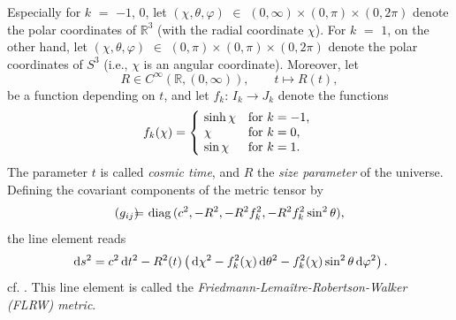 Especially for $k$ $=$ $-1$, $0$, let
$(\chi,\theta,\varphi)$ $\in$ $(0, \infty) \times (0,\pi) \times (0, 2\pi)$
denote the polar coordinates of $\mathbb{R}^3$ (with the radial coordinate $\chi$). For $k$ $=$ $1$, on the other hand, let $(\chi, \theta, \varphi)$ $\in$ $(0, \pi) \times (0,\pi) \times (0, 2\pi)$ denote the polar coordinates of $S^3$ (i.e., $\chi$ is an angular coordinate). Moreover, let
\begin{equation}
	R \in C^\infty(\mathbb{R}, (0, \infty)), \qquad t \mapsto R(t),
	\label{eq:FLRW-R} %
\end{equation}
be a function depending on $t$, and let $f_k$: $I_k \to J_k$ denote the functions
\begin{equation}
	f_k(\chi) = \left\{\begin{array}{@{\ }ll}
		\sinh \chi & \mbox{for $k=-1$,} \\
		\chi       & \mbox{for $k=0$,} \\
		\sin \chi  & \mbox{for $k=1$.}
	\end{array}\right.
	\label{(3.23)}
\end{equation}
The parameter $t$ is called \emph{cosmic time},
and $R$ the \emph{size parameter}
of the universe. 
Defining the covariant %
components of the metric tensor by
\begin{eqnarray*}
	(g_{ij}) & \hspace*{-1.5ex} = \hspace{-1.5ex} & 
	\mathrm{diag}\,(c^2, -R^2, -R^2 f_k^2, - R^2 f_k^2 \sin^2\theta)
	,
\end{eqnarray*}
the line element reads
\begin{equation}
	\D s^2 = 
	c^2 \D t^2 - R^2(t) \left( \D\chi^2 - f_k^2(\chi) \D \theta^2 - f_k^2(\chi) \sin^2 \theta \D\varphi^2 \right)
	.
	\label{eq:FLRW-line-element-in-polar-coordinates} %
\end{equation}
cf. \cite[(112,2)]{Landau-Lifschitz-1997}. 
This line element is called the \emph{Fried\-mann-Lemaître-Robertson-Walker (FLRW) metric}.
